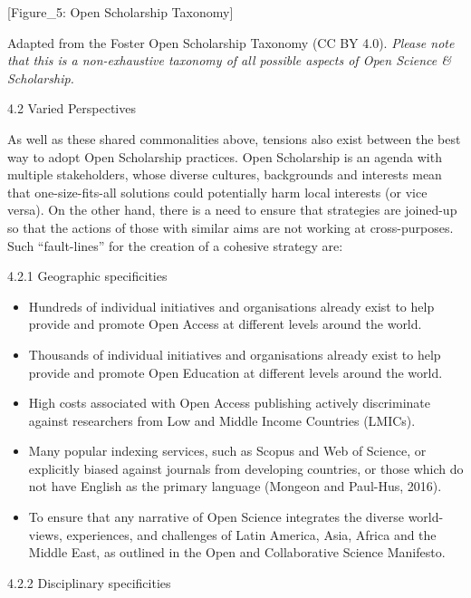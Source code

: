 \documentclass[]{article}
\begin{document}
{[}Figure\_5: Open Scholarship Taxonomy{]}

Adapted from the Foster Open Scholarship Taxonomy (CC BY 4.0).
\emph{Please note that this is a non-exhaustive taxonomy of all possible
aspects of Open Science \& Scholarship.}

4.2 Varied Perspectives

As well as these shared commonalities above, tensions also exist between
the best way to adopt Open Scholarship practices. Open Scholarship is an
agenda with multiple stakeholders, whose diverse cultures, backgrounds
and interests mean that one-size-fits-all solutions could potentially
harm local interests (or vice versa). On the other hand, there is a need
to ensure that strategies are joined-up so that the actions of those
with similar aims are not working at cross-purposes. Such
``fault-lines'' for the creation of a cohesive strategy are:

4.2.1 Geographic specificities

\begin{itemize}
\item
  Hundreds of individual initiatives and organisations already exist to
  help provide and promote Open Access at different levels around the
  world.
\item
  Thousands of individual initiatives and organisations already exist to
  help provide and promote Open Education at different levels around the
  world.
\item
  High costs associated with Open Access publishing actively
  discriminate against researchers from Low and Middle Income Countries
  (LMICs).
\item
  Many popular indexing services, such as Scopus and Web of Science, or
  explicitly biased against journals from developing countries, or those
  which do not have English as the primary language (Mongeon and
  Paul-Hus, 2016).
\item
  To ensure that any narrative of Open Science integrates the diverse
  world-views, experiences, and challenges of Latin America, Asia,
  Africa and the Middle East, as outlined in the Open and Collaborative
  Science Manifesto.
\end{itemize}

4.2.2 Disciplinary specificities
\end{document}
